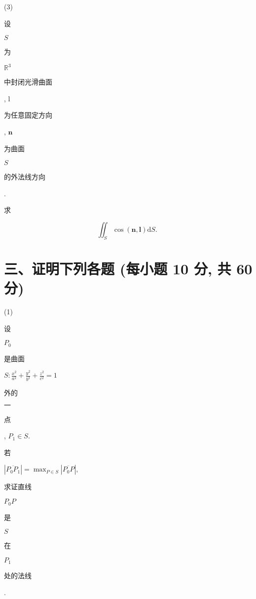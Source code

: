 \documentclass[10pt]{article}
\begin{document}
(3) \begin{CJK}{UTF8}{mj}设\end{CJK} $S$ \begin{CJK}{UTF8}{mj}为\end{CJK} $\mathbb{R}^{3}$ \begin{CJK}{UTF8}{mj}中封闭光滑曲面\end{CJK}, l \begin{CJK}{UTF8}{mj}为任意固定方向\end{CJK}, $\mathbf{n}$ \begin{CJK}{UTF8}{mj}为曲面\end{CJK} $S$ \begin{CJK}{UTF8}{mj}的外法线方向\end{CJK}. \begin{CJK}{UTF8}{mj}求\end{CJK}
$$
\iint_{S} \cos (\mathbf{n}, \mathbf{l}) \mathrm{d} S \text {. }
$$

\section{三、证明下列各题 (每小题 10 分, 共 60 分)}
(1) \begin{CJK}{UTF8}{mj}设\end{CJK} $P_{0}$ \begin{CJK}{UTF8}{mj}是曲面\end{CJK} $S: \frac{x^{2}}{a^{2}}+\frac{y^{2}}{b^{2}}+\frac{z^{2}}{c^{2}}=1$ \begin{CJK}{UTF8}{mj}外的\end{CJK} $一$ \begin{CJK}{UTF8}{mj}点\end{CJK}, $P_{1} \in S$. \begin{CJK}{UTF8}{mj}若\end{CJK} $\left|\overline{P_{0} P_{1}}\right|=\max _{P \in S}\left|\overline{P_{0} P}\right|$, \begin{CJK}{UTF8}{mj}求证直线\end{CJK} $P_{0} P$ \begin{CJK}{UTF8}{mj}是\end{CJK} $S$ \begin{CJK}{UTF8}{mj}在\end{CJK} $P_{1}$ \begin{CJK}{UTF8}{mj}处的法线\end{CJK}.
\end{document}
